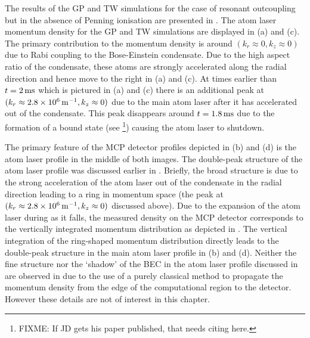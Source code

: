 The results of the GP and TW simulations for the case of resonant outcoupling but in the absence of Penning ionisation are presented in . The atom laser momentum density for the GP and TW simulations are displayed in (a) and (c). The primary contribution to the momentum density is around $(k_r \approx 0, k_z \approx 0)$ due to Rabi coupling to the Bose-Einstein condensate. Due to the high aspect ratio of the condensate, these atoms are strongly accelerated along the radial direction and hence move to the right in (a) and (c). At times earlier than $t=\unit[2]{ms}$ which is pictured in (a) and (c) there is an additional peak at $(k_r \approx \unit[2.8 \times 10^6]{m}^{-1}, k_z \approx 0)$ due to the main atom laser after it has accelerated out of the condensate. This peak disappears around $t=\unit[1.8]{ms}$ due to the formation of a bound state (see \citep{Robins:2005uq}\footnote{FIXME: If JD gets his paper published, that needs citing here.}) causing the atom laser to shutdown.

The primary feature of the MCP detector profiles depicted in (b) and (d) is the atom laser profile in the middle of both images. The double-peak structure of the atom laser profile was discussed earlier in . Briefly, the broad structure is due to the strong acceleration of the atom laser out of the condensate in the radial direction leading to a ring in momentum space (the peak at $(k_r \approx \unit[2.8 \times10^6]{m}^{-1}, k_z \approx 0)$ discussed above). Due to the expansion of the atom laser during as it falls, the measured density on the MCP detector corresponds to the vertically integrated momentum distribution as depicted in . The vertical integration of the ring-shaped momentum distribution directly leads to the double-peak structure in the main atom laser profile in (b) and (d). Neither the fine structure nor the `shadow' of the BEC in the atom laser profile discussed in  are observed in  due to the use of a purely classical method to propagate the momentum density from the edge of the computational region to the detector. However these details are not of interest in this chapter.

